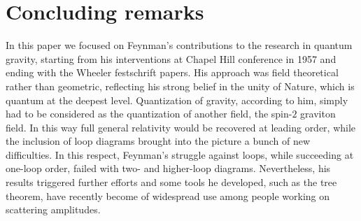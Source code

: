 \documentclass{ws-procs961x669}            %
\begin{document}
\section{Concluding remarks}
In this paper we focused on Feynman's contributions to the
research in quantum gravity, starting from his interventions at
Chapel Hill conference in 1957 and ending with the Wheeler
festschrift papers. His approach was field theoretical rather than
geometric, reflecting his strong belief in the unity of Nature,
which is quantum at the deepest level. Quantization of gravity,
according to him, simply had to be considered as the quantization
of another field, the spin-$2$ graviton field. In this way full
general relativity would be recovered at leading order, while the
inclusion of loop diagrams brought into the picture a bunch of new
difficulties. In this respect, Feynman's struggle against loops,
while succeeding at one-loop order, failed with two- and
higher-loop diagrams. Nevertheless, his results triggered further
efforts and some tools he developed, such as the tree theorem,
have recently become of widespread use among people working on
scattering amplitudes.







%
%


\end{document}
